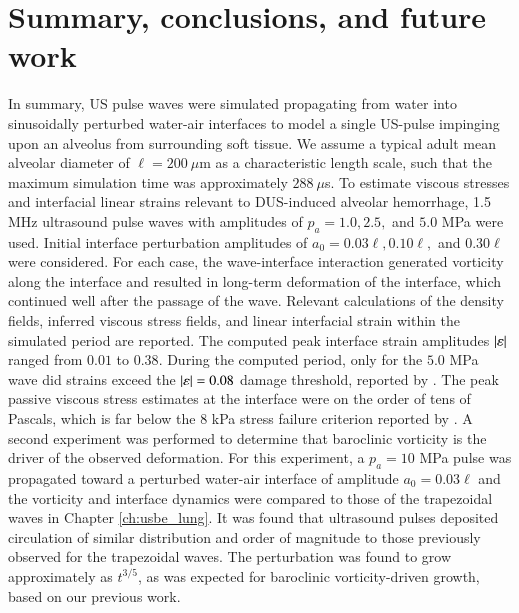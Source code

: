 \section{Summary, conclusions, and future work}
\label{sec:usbe_lung_bio_conclusions}
In summary, \ac{US} pulse waves were simulated propagating from water
into sinusoidally perturbed water-air interfaces to model a single
\ac{US}-pulse impinging upon an alveolus from surrounding soft
tissue. We assume a typical adult mean alveolar diameter of
$\ell=200~\mu$m \citep{Ochs2004} as a characteristic length scale,
such that the maximum simulation time was approximately $288~\mu$s. To
estimate viscous stresses and interfacial linear strains relevant to
\ac{DUS}-induced alveolar hemorrhage, 1.5 MHz ultrasound pulse waves
with amplitudes of $p_a=1.0, 2.5,$ and $5.0$ MPa were used. Initial
interface perturbation amplitudes of $a_0= 0.03\ell, 0.10\ell,$ and
$0.30\ell$ were considered. For each case, the wave-interface
interaction generated vorticity along the interface and resulted in
long-term deformation of the interface, which continued well after the
passage of the wave. Relevant calculations of the density fields,
inferred viscous stress fields, and linear interfacial strain within
the simulated period are reported. The computed peak interface strain
amplitudes $\left|\varepsilon\right|$ ranged from $0.01$ to $0.38$. During
the computed period, only for the $5.0$ MPa wave did strains exceed the
$\left|\varepsilon\right|=0.08$ damage threshold, reported by
\cite{Belete2010}. The peak passive viscous stress estimates at the
interface were on the order of tens of Pascals, which is far below the
$8$ kPa stress failure criterion reported by \cite{West1991}. A second
experiment was performed to determine that baroclinic vorticity is the
driver of the observed deformation. For this experiment, a $p_a = 10$
MPa pulse was propagated toward a perturbed water-air interface of
amplitude $a_0 = 0.03\ell$ and the vorticity and interface dynamics
were compared to those of the trapezoidal waves in Chapter
\ref{ch:usbe_lung}. It was found that ultrasound pulses deposited
circulation of similar distribution and order of magnitude to those
previously observed for the trapezoidal waves. The perturbation was found
to grow approximately as $t^{3/5}$, as was expected for baroclinic
vorticity-driven growth, based on our previous work.

